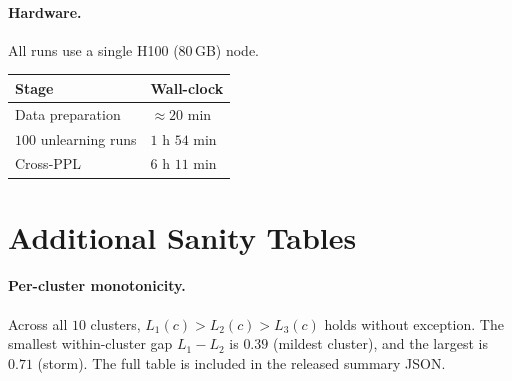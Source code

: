 \documentclass[11pt,a4paper]{article}
\newcommand{\Lone}{L_1}
\newcommand{\Ltwo}{L_2}
\newcommand{\Lthree}{L_3}
\begin{document}
\paragraph{Hardware.} All runs use a single H100 (80\,GB) node.
\begin{center}
\footnotesize
\begin{tabular}{@{}ll@{}}
    \toprule
    Stage & Wall-clock \\
    \midrule
    Data preparation & $\approx 20$ min \\
    $100$ unlearning runs & $1$ h $54$ min \\
    Cross-PPL & $6$ h $11$ min \\
    \bottomrule
\end{tabular}
\end{center}

\section{Additional Sanity Tables}
\label{app:tables}

\paragraph{Per-cluster monotonicity.} Across all $10$ clusters,
$\Lone(c){>}\Ltwo(c){>}\Lthree(c)$ holds without exception. The smallest
within-cluster gap $\Lone{-}\Ltwo$ is $0.39$ (mildest cluster), and the largest
is $0.71$ (storm). The full table is included in the released summary JSON.
\end{document}
